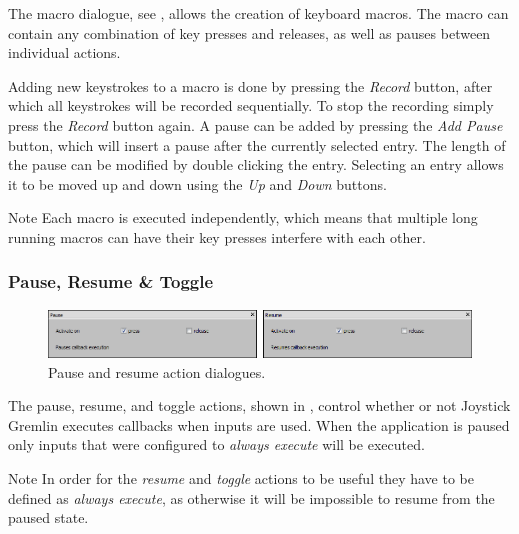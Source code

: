 \documentclass[a4, 10pt]{article}
\newcommand{\JG}{Joystick Gremlin}
\begin{document}
The macro dialogue, see , allows the creation of
keyboard macros. The macro can contain any combination of key presses
and releases, as well as pauses between individual actions.

Adding new keystrokes to a macro is done by pressing the \emph{Record}
button, after which all keystrokes will be recorded sequentially. To
stop the recording simply press the \emph{Record} button again. A pause
can be added by pressing the \emph{Add Pause} button, which will insert
a pause after the currently selected entry. The length of the pause can
be modified by double clicking the entry. Selecting an entry allows it
to be moved up and down using the \emph{Up} and \emph{Down} buttons.

\vspace{1em}
\begin{bclogo}[
    couleur=yellow!40,
    couleurBord=orange!80,
    couleurBarre=orange!80,
    arrondi=0.1,
    logo=\bcinfo
]{Note}
    Each macro is executed independently, which means that multiple long
    running macros can have their key presses interfere with each other.
\end{bclogo}


\subsubsection{Pause, Resume \& Toggle}

\begin{figure}[bt]
    \centering

    \includegraphics[width=0.95\linewidth]{images/action_pause_resume}

    \caption{Pause and resume action dialogues.}
    \label{fig:action_pause_resume}
\end{figure}

The pause, resume, and toggle actions, shown in ,
control whether or not \JG{} executes callbacks when inputs are used.
When the application is paused only inputs that were configured to
\emph{always execute} will be executed.

\vspace{1em}
\begin{bclogo}[
    couleur=yellow!40,
    couleurBord=orange!80,
    couleurBarre=orange!80,
    arrondi=0.1,
    logo=\bcinfo
]{Note}
    In order for the \emph{resume} and \emph{toggle} actions to be
    useful they have to be defined as \emph{always execute}, as
    otherwise it will be impossible to resume from the paused state.
\end{bclogo}
\end{document}
